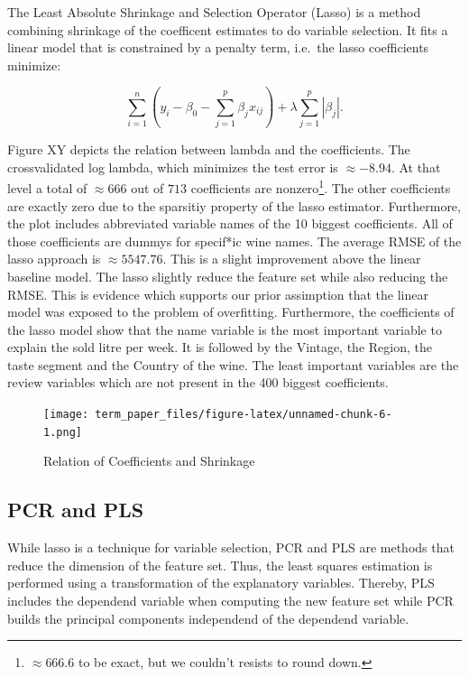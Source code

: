 \documentclass[11pt,]{article}
\let\rmarkdownfootnote\footnote%
\def\footnote{\protect\rmarkdownfootnote}
\begin{document}
The Least Absolute Shrinkage and Selection Operator (Lasso) is a method
combining shrinkage of the coefficent estimates to do variable
selection. It fits a linear model that is constrained by a penalty term,
i.e.~the lasso coefficients minimize:

\[
\sum_{i=1}^{n}(y_i - \beta_0 - \sum_{j=1}^{p}\beta_jx_{ij})+\lambda\sum_{j=1}^{p}|\beta_j|.
\]

Figure XY depicts the relation between lambda and the coefficients. The
crossvalidated log lambda, which minimizes the test error is
\(\approx -8.94\). At that level a total of \(\approx 666\) out of
\(713\) coefficients are
nonzero\footnote{$\approx 666.6$ to be exact, but we couldn't resists to round down.}.
The other coefficients are exactly zero due to the sparsitiy property of
the lasso estimator. Furthermore, the plot includes abbreviated variable
names of the 10 biggest coefficients. All of those coefficients are
dummys for specif*ic wine names. The average RMSE of the lasso approach
is \(\approx 5547.76\). This is a slight improvement above the linear
baseline model. The lasso slightly reduce the feature set while also
reducing the RMSE. This is evidence which supports our prior assimption
that the linear model was exposed to the problem of overfitting.
Furthermore, the coefficients of the lasso model show that the name
variable is the most important variable to explain the sold litre per
week. It is followed by the Vintage, the Region, the taste segment and
the Country of the wine. The least important variables are the review
variables which are not present in the 400 biggest coefficients.

\begin{figure}
\centering
\texttt{[image: term\_paper\_files/figure-latex/unnamed-chunk-6-1.png]}
\caption{Relation of Coefficients and Shrinkage}
\end{figure}

\hypertarget{pcr-and-pls}{%
\subsection{PCR and PLS}\label{pcr-and-pls}}

While lasso is a technique for variable selection, PCR and PLS are
methods that reduce the dimension of the feature set. Thus, the least
squares estimation is performed using a transformation of the
explanatory variables. Thereby, PLS includes the dependend variable when
computing the new feature set while PCR builds the principal components
independend of the dependend variable.
\end{document}
